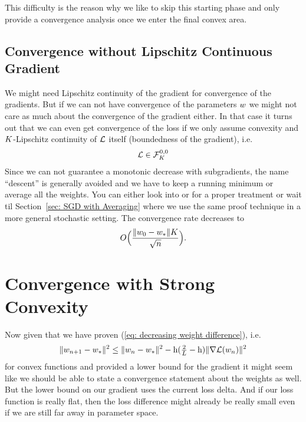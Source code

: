 This difficulty is the reason why we like to skip this starting phase and only
provide a convergence analysis once we enter the final convex area.

\subsection{Convergence without Lipschitz Continuous Gradient}\label{subsec: subgradient method}

We might need Lipschitz continuity of the gradient for convergence of the
gradients. But if we can not have convergence of the parameters \(\weights\) we
might not care as much about the convergence of the gradient either. In that
case it turns out that we can even get convergence of the loss if we only assume
convexity and \(\lipConst\)-Lipschitz continuity of \(\Loss\) itself
(boundedness of the gradient), i.e.
\begin{align*}
	\Loss \in \lipGradientSet[0,0]{\lipConst}
\end{align*}
%
Since we can not guarantee a monotonic decrease with subgradients, the name
``descent'' is generally avoided and we have to keep a running minimum or
average all the weights. You can either look into \textcite[Section
2.2.3]{nesterovLecturesConvexOptimization2018} or \textcite[Section
2.1]{bubeckConvexOptimizationAlgorithms2015} for a proper
treatment or wait til Section~\ref{sec: SGD with Averaging} where we use
the same proof technique in a more general stochastic setting. The convergence
rate decreases to
\begin{align*}
	O\Big(\frac{\|\weights_0-\weights_*\|\lipConst}{\sqrt{n}}\Big).
\end{align*}

\section{Convergence with Strong Convexity}\label{sec: Strong Convexity}

Now given that we have proven (\ref{eq: decreasing weight difference}), i.e.
\begin{align}\label{eq: weight iteration}
	\|\weights_{n+1}-\minimum\|^2
	\le \|\weights_n - \minimum\|^2 - \lr(\tfrac2{\ubound} -\lr)\|\nabla\Loss(\weights_n)\|^2
\end{align}
for convex functions and provided a lower bound for the gradient it might seem
like we should be able to state a convergence statement about the weights as
well. But the lower bound on our gradient uses the current loss delta. And if
our loss function is really flat, then the loss difference might already be
really small even if we are still far away in parameter space.

